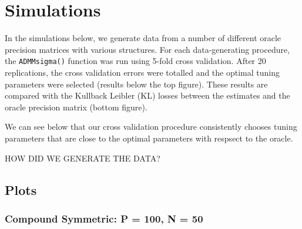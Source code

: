 \documentclass[11pt,]{report}
\newenvironment{Shaded}{\begin{snugshade}}{\end{snugshade}}
\newcommand{\CommentTok}[1]{\textcolor[rgb]{0.56,0.35,0.01}{\textit{#1}}}
\newcommand{\DataTypeTok}[1]{\textcolor[rgb]{0.13,0.29,0.53}{#1}}
\newcommand{\DecValTok}[1]{\textcolor[rgb]{0.00,0.00,0.81}{#1}}
\newcommand{\FloatTok}[1]{\textcolor[rgb]{0.00,0.00,0.81}{#1}}
\newcommand{\KeywordTok}[1]{\textcolor[rgb]{0.13,0.29,0.53}{\textbf{#1}}}
\newcommand{\NormalTok}[1]{#1}
\newcommand{\OperatorTok}[1]{\textcolor[rgb]{0.81,0.36,0.00}{\textbf{#1}}}
\newcommand{\OtherTok}[1]{\textcolor[rgb]{0.56,0.35,0.01}{#1}}
\newcommand{\StringTok}[1]{\textcolor[rgb]{0.31,0.60,0.02}{#1}}
\begin{document}
\hypertarget{simulations}{%
\section{Simulations}\label{simulations}}

In the simulations below, we generate data from a number of different oracle precision matrices with various structures. For each data-generating procedure, the \texttt{ADMMsigma()} function was run using 5-fold cross validation. After 20 replications, the cross validation errors were totalled and the optimal tuning parameters were selected (results below the top figure). These results are compared with the Kullback Leibler (KL) losses between the estimates and the oracle precision matrix (bottom figure).

We can see below that our cross validation procedure consistently chooses tuning parameters that are close to the optimal parameters with respsect to the oracle.

HOW DID WE GENERATE THE DATA?

\hypertarget{plots}{%
\subsection{Plots}\label{plots}}

\hypertarget{compound-symmetric-p-100-n-50}{%
\subsubsection{Compound Symmetric: P = 100, N = 50}\label{compound-symmetric-p-100-n-50}}

\begin{Shaded}
\end{Shaded}
\end{document}
